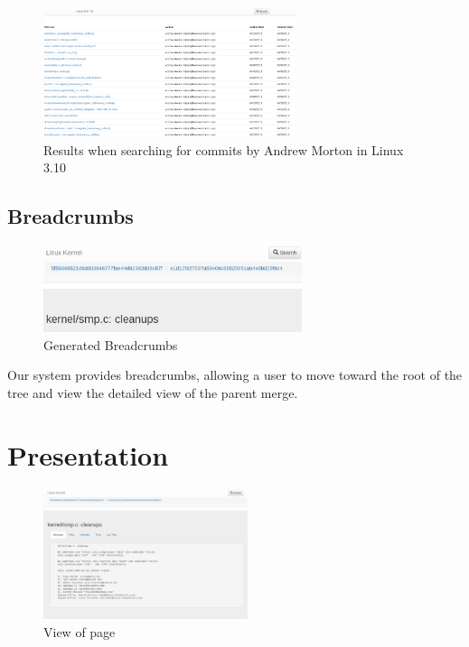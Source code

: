 \documentclass[conference, draftclsnofoot]{IEEEtran}
\begin{document}
\begin{figure}[h]
	\centering
	\includegraphics[height=1.5in]{figures/results_view.png}
	\caption{Results when searching for commits by Andrew Morton in Linux
	3.10}
	\label{fig:results_view}
\end{figure}


\subsection{Breadcrumbs}

\begin{figure}[h]
	\centering
	\includegraphics[height=1.0in]{figures/breadcrumbs.png}
	\caption{Generated Breadcrumbs}
	\label{fig:breadcrumbs}
\end{figure}

Our system provides breadcrumbs, allowing a user to move toward the root of the
tree and view the detailed view of the parent merge.

\section{Presentation}

\begin{figure}[h]
	\centering
	\includegraphics[height=1.5in]{figures/page.png}
	\caption{View of page}
	\label{fig:full page}
\end{figure}
\end{document}
